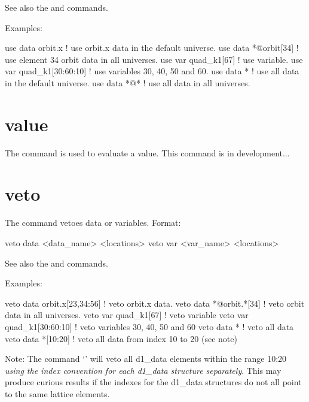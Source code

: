 {{{See also the  and  commands.

Examples:
\begin{example}
  use data orbit.x             ! use orbit.x data in the default universe.
  use data *@orbit[34]         ! use element 34 orbit data in all universes.
  use var quad_k1[67]          ! use variable.
  use var quad_k1[30:60:10]    ! use variables 30, 40, 50 and 60.
  use data *                   ! use all data in the default universe.
  use data *@*                 ! use all data in all universes.
\end{example}


\section{value}
\label{s:value}

The  command is used to evaluate a value. 
This command is in development...

\section{veto}
\label{s:veto}

The  command vetoes data or variables. Format:
\begin{example}
  veto data <data_name> <locations>
  veto var <var_name> <locations>
\end{example}

\vskip 0.1in 

See also the  and  commands.

Examples:
\begin{example}
  veto data orbit.x[23,34:56]  ! veto orbit.x data.
  veto data *@orbit.*[34]      ! veto orbit data in all universes.
  veto var quad_k1[67]         ! veto variable
  veto var quad_k1[30:60:10]   ! veto variables 30, 40, 50 and 60
  veto data *                  ! veto all data
  veto data *[10:20]           ! veto all data from index 10 to 20 (see note)
\end{example}

Note: The command `' will veto all d1\_data elements
within the range 10:20 \textit{using the index convention for each d1\_data
structure separately}. This may produce curious results if the
indexes for the d1\_data structures do not all point to the same lattice
elements. 

}}}
